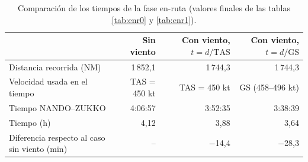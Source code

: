 \begin{table}[htbp]
\centering
\footnotesize\setlength{\tabcolsep}{3.5pt}
\caption{Comparación de los tiempos de la fase en-ruta (valores finales de las tablas \ref{tab:enr0} y \ref{tab:enr1}).}\label{tab:enrcomp}
\begin{tabular}{lrrr}
\toprule
 & Sin viento & Con viento, $t=d/\mathrm{TAS}$ & Con viento, $t=d/\mathrm{GS}$\\
\midrule
Distancia recorrida (NM) & 1\,852,1 & 1\,744,3 & 1\,744,3\\
Velocidad usada en el tiempo & TAS = 450 kt & TAS = 450 kt & GS (458--496 kt)\\
Tiempo NANDO--ZUKKO & 4:06:57 & 3:52:35 & 3:38:39\\
Tiempo (h) & 4,12 & 3,88 & 3,64\\
Diferencia respecto al caso sin viento (min) & -- & $-$14,4 & $-$28,3\\
\bottomrule
\end{tabular}
\end{table}
